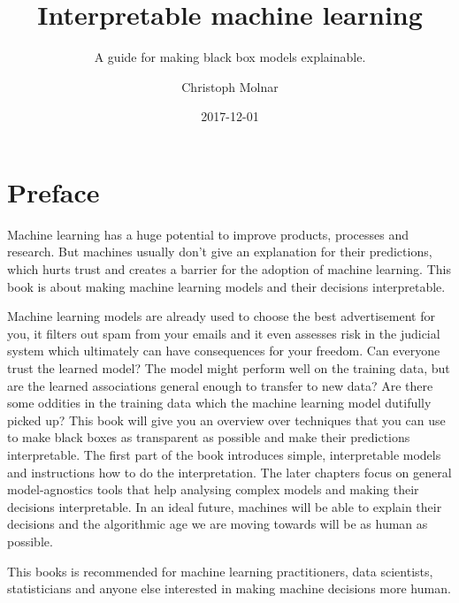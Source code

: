 \documentclass[12pt,]{krantz}
\title{Interpretable machine learning}
\subtitle{A guide for making black box models explainable.}
\author{Christoph Molnar}
\date{2017-12-01}
\theoremstyle{definition}
\theoremstyle{definition}
\theoremstyle{definition}
\theoremstyle{remark}
\begin{document}
\maketitle



\setlength{\abovedisplayskip}{-5pt}
\setlength{\abovedisplayshortskip}{-5pt}

{
\hypersetup{linkcolor=black}
\setcounter{tocdepth}{1}
\tableofcontents
}
\chapter*{Preface}\label{preface}

Machine learning has a huge potential to improve products, processes and
research. But machines usually don't give an explanation for their
predictions, which hurts trust and creates a barrier for the adoption of
machine learning. This book is about making machine learning models and
their decisions interpretable.

Machine learning models are already used to choose the best
advertisement for you, it filters out spam from your emails and it even
assesses risk in the judicial system which ultimately can have
consequences for your freedom. Can everyone trust the learned model? The
model might perform well on the training data, but are the learned
associations general enough to transfer to new data? Are there some
oddities in the training data which the machine learning model dutifully
picked up? This book will give you an overview over techniques that you
can use to make black boxes as transparent as possible and make their
predictions interpretable. The first part of the book introduces simple,
interpretable models and instructions how to do the interpretation. The
later chapters focus on general model-agnostics tools that help
analysing complex models and making their decisions interpretable. In an
ideal future, machines will be able to explain their decisions and the
algorithmic age we are moving towards will be as human as possible.

This books is recommended for machine learning practitioners, data
scientists, statisticians and anyone else interested in making machine
decisions more human.
\end{document}
